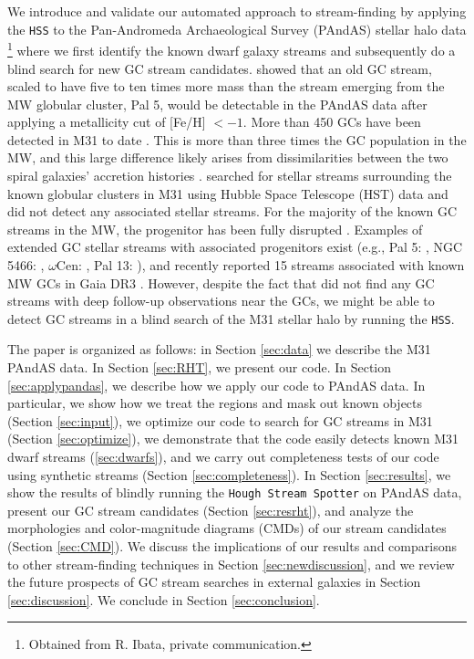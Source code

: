 \documentclass[twocolumn]{aastex631}
\begin{document}
We  introduce  and  validate  our automated approach to stream-finding by applying the \texttt{HSS} to the Pan-Andromeda Archaeological Survey (PAndAS) stellar halo data \citep{mcconnachie2009,McConnachie18}\footnote{Obtained from R. Ibata, private communication.} where we first identify the known dwarf galaxy streams and subsequently do a blind search for new GC stream candidates. 
 showed that an old GC stream, scaled to have five to ten times more mass than the stream emerging from the MW globular cluster, Pal 5, would be detectable in the PAndAS data after applying a metallicity cut of [Fe/H] $< -1$.
More than 450 GCs have been detected in M31 to date \citep[][]{huxor14,caldwell16,mackey19}. This is more than three times the GC population in the MW, and this large difference likely arises from dissimilarities between the two spiral galaxies' accretion histories \citep[e.g.,][]{deason13,forbes18}. 
\citet{huxor14} searched for stellar streams surrounding the known globular clusters in M31 using Hubble Space Telescope (HST) data and did not detect any associated stellar streams. For the majority of the known GC streams in the MW, the progenitor has been fully disrupted \citep[e.g.,][]{balbinot18}. Examples of extended GC stellar streams with associated progenitors exist (e.g., Pal 5: \citealt{oden01}, NGC 5466: \citealt{grillmair06b}, $\omega$Cen: \citealt{ibata19}, Pal 13: \citealt{ship20}), and \citet{ibata21} recently reported 15 streams associated with known MW GCs in Gaia DR3 \citep{gaiadr3}. However, despite the fact that \citet{huxor14} did not find any GC streams with deep follow-up observations near the GCs, we might be able to detect GC streams in a blind search of the M31 stellar halo by running the \texttt{HSS}.

The paper is organized as follows: in Section \ref{sec:data} we describe the M31 PAndAS data. In Section \ref{sec:RHT}, we present our code.  
In Section \ref{sec:applypandas}, we describe how we apply our code to PAndAS data. In particular, we show how we treat the regions and mask out known objects (Section \ref{sec:input}), we optimize our code to search for GC streams in M31 (Section \ref{sec:optimize}), we 
demonstrate that the code easily detects known M31 dwarf streams (\ref{sec:dwarfs}), and we carry out completeness tests of our code using synthetic streams (Section \ref{sec:completeness}).
In Section \ref{sec:results}, we show the results of blindly running the \texttt{Hough Stream Spotter} on PAndAS data, present our GC stream candidates (Section \ref{sec:resrht}), and analyze the morphologies and color-magnitude diagrams (CMDs) of our stream candidates (Section \ref{sec:CMD}). We
discuss the implications of our results and comparisons to other stream-finding techniques in Section \ref{sec:newdiscussion}, and we review the future prospects of GC stream searches in external galaxies in Section \ref{sec:discussion}. We conclude in Section \ref{sec:conclusion}. 
\end{document}
